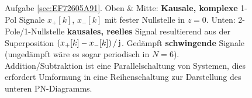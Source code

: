 \begin{figure}
%
\caption{Aufgabe \ref{sec:EF72605A91}. Oben \& Mitte: \textbf{Kausale, komplexe}
1-Pol Signale $x_+[k]$, $x_-[k]$ mit fester Nullstelle in $z=0$.
Unten: 2-Pole/1-Nullstelle \textbf{kausales, reelles} Signal resultierend aus
der Superposition $(x_+[k]-x_-[k])\,/\,\im$.
Gedämpft \textbf{schwingende}
Signale (ungedämpft wäre es sogar periodisch in $N=6$).
Addition/Subtraktion ist eine Parallelschaltung von Systemen, dies
erfordert Umformung in eine Reihenschaltung zur Darstellung des unteren
PN-Diagramms.}
\label{fig:EF72605A91}
\end{figure}
